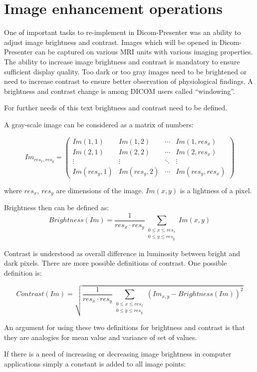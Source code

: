 \section{Image enhancement operations}
\label{brightnesscontrast}

One of important tasks to re-implement in Dicom-Presenter was an ability to adjust image brightness and contrast. Images which will be opened in Dicom-Presenter can be captured on various MRI units with various imaging properties. The ability to increase image brightness and contrast is mandatory to ensure sufficient display quality. Too dark or too gray images need to be brightened or need to increase contrast to ensure better observation of physiological findings. A brightness and contrast change is among DICOM users called ``windowing''.

For further needs of this text brightness and contrast need to be defined. 

A gray-scale image can be considered as a matrix of numbers: 

\[
 Im_{res_{x},res_{y}} =
 \begin{pmatrix}
  Im(1,1) & Im(1,2) & \cdots & Im(1,res_{x}) \\
  Im(2,1) & Im(2,2) & \cdots & Im(2,res_{x}) \\
  \vdots  & \vdots  & \ddots & \vdots  \\
  Im(res_{y},1) & Im(res_{y},2) & \cdots & Im(res_{y},res_{x})
 \end{pmatrix}
\]

where $ res_{x} $, $res_{y}$ are dimensions of the image. $Im(x,y)$ is a lightness of a pixel.

Brightness then can be defined as:
\[
  Brightness(Im) = \frac{1}{res_{x}  \cdot res_{y}}\sum_{\substack{0 \leq x \leq res_{x} \\ 0 \leq y \leq res_{y}}} Im(x,y)
\]

Contrast is understood as overall difference in luminosity between bright and dark pixels. There are more possible definitions of contrast. One possible definition is:

\[
Contrast(Im) = \sqrt{\frac{1}{res_{x} \cdot res_{y}}\sum_{\substack{ 0 \leq x \leq res_{x} \\ 0 \leq y \leq res_{y} }}(Im_{x,y}-Brightness(Im))^2}
\]

An argument for using these two definitions for brightness and contrast is that they are analogies for mean value and variance of set of values.

If there is a need of increasing or decreasing image brightness in computer applications simply a constant is added to all image points:

